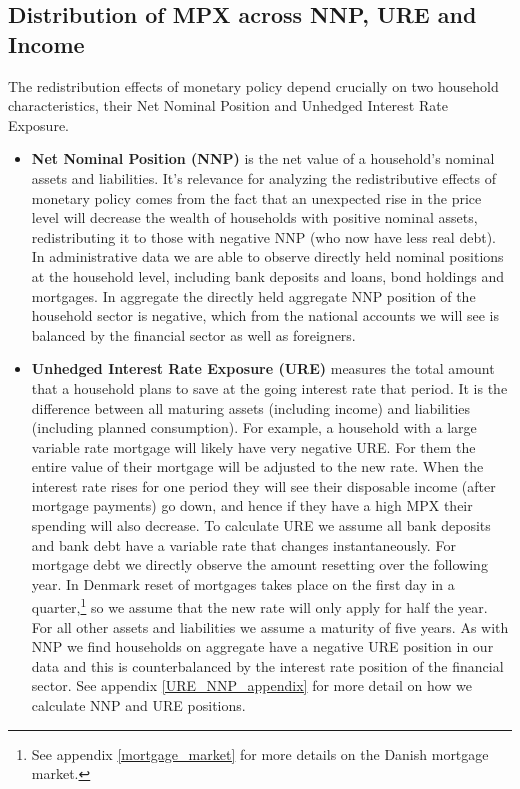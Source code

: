 \documentclass[titlepage]{\econtex}\newcommand{\texname}{ConsumptionHeterogeneity}
\begin{document}
\subsection{Distribution of MPX across NNP, URE and Income}
The redistribution effects of monetary policy depend crucially on two household characteristics, their Net Nominal Position and Unhedged Interest Rate Exposure.
\begin{itemize}
	\item \textbf{Net Nominal Position (NNP)} is the net value of a household's nominal assets and liabilities. It's relevance for analyzing the redistributive effects of monetary policy comes from the fact that an unexpected rise in the price level will decrease the wealth of households with positive nominal assets, redistributing it to those with negative NNP (who now have less real debt). In administrative data we are able to observe directly held nominal positions at the household level, including bank deposits and loans, bond holdings and mortgages. In aggregate the directly held aggregate NNP position of the household sector is negative, which from the national accounts we will see is balanced by the financial sector as well as foreigners.
	\item \textbf{Unhedged Interest Rate Exposure (URE)} measures the total amount that a household plans to save at the going interest rate that period. It is the difference between all maturing assets (including income) and liabilities (including planned consumption). For example, a household with a large variable rate mortgage will likely have very negative URE. For them the entire value of their mortgage will be adjusted to the new rate. When the interest rate rises for one period they will see their disposable income (after mortgage payments) go down, and hence if they have a high MPX their spending will also decrease. To calculate URE we assume all bank deposits and bank debt have a variable rate that changes instantaneously. For mortgage debt we directly observe the amount resetting over the following year. In Denmark reset of mortgages takes place on the first day in a quarter,\footnote{See appendix \ref{mortgage_market} for more details on the Danish mortgage market.} so we assume that the new rate will only apply for half the year. For all other assets and liabilities we assume a maturity of five years. As with NNP we find households on aggregate have a negative URE position in our data and this is counterbalanced by the interest rate position of the financial sector. See appendix \ref{URE_NNP_appendix} for more detail on how we calculate NNP and URE positions.
\end{itemize}
\end{document}
